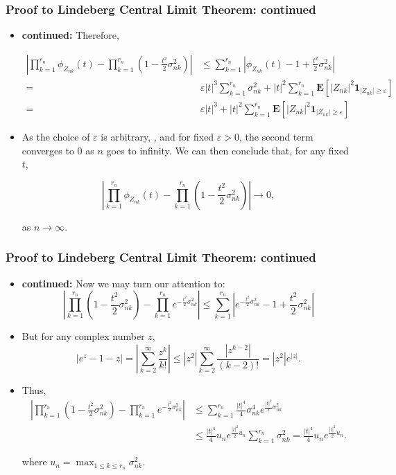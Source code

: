 \documentclass[handout]{beamer}
\newcommand{\BE}{\mathbf{E}}
\newcommand{\BI}{\mathbf{1}}
\begin{document}
 
      \frame
{
  \frametitle{Proof to Lindeberg Central Limit Theorem: continued}
   \begin{itemize}

\item<1->\textbf{continued:}  Therefore, 

\begin{align*} |\prod_{k=1}^{r_n} \phi_{Z_{nk}}(t)-\prod_{k=1}^{r_n} (1-\frac{t^2}{2} \sigma^2_{nk})| &  \leq \sum_{k=1}^{r_n} | \phi_{Z_{nk}}(t)-1+\frac{t^2}{2} \sigma^2_{nk} | \\
=&\varepsilon |t|^3 \sum_{k=1}^{r_n} \sigma_{nk}^2 + |t|^2 \sum_{k=1}^{r_n} \BE[|Z_{nk}|^2 \BI_{|Z_{nk}|\geq \varepsilon}]  \\
=&\varepsilon |t|^3  + |t|^2 \sum_{k=1}^{r_n} \BE[|Z_{nk}|^2 \BI_{|Z_{nk}|\geq \varepsilon}] 
\end{align*}

\item<2->[-] As the choice of $\varepsilon$ is arbitrary, , and for fixed $\varepsilon>0$, the second term converges to 0 as $n$ goes to infinity. We can then conclude that, for any fixed $t$, 

$$ |\prod_{k=1}^{r_n} \phi_{Z_{nk}}(t)-\prod_{k=1}^{r_n} (1-\frac{t^2}{2} \sigma^2_{nk})|  \rightarrow 0,$$

as $n\rightarrow \infty.$

\end{itemize}
}



 
      \frame
{
  \frametitle{Proof to Lindeberg Central Limit Theorem: continued}
   \begin{itemize}

\item<1->\textbf{continued:}  Now we may turn our attention to: 
$$ |\prod_{k=1}^{r_n} (1-\frac{t^2}{2} \sigma^2_{nk})-\prod_{k=1}^{r_n} e^{-\frac{t^2}{2}\sigma^2_{nk}}| \leq \sum_{k=1}^{r_n}| e^{-\frac{t^2}{2}\sigma^2_{nk}}-1+\frac{t^2}{2} \sigma^2_{nk}|$$

\item<2->[-] But for any complex number $z$,
$$|e^z-1-z|=|\sum_{k=2}^{\infty} \frac{z^k}{k!}| \leq |z^2| \sum_{k=2}^{\infty} \frac{|z^{k-2}|}{(k-2)!}=|z^2| e^{|z|}.$$

\item<3->[-] Thus, 
\begin{align*} |\prod_{k=1}^{r_n} (1-\frac{t^2}{2} \sigma^2_{nk})-\prod_{k=1}^{r_n} e^{-\frac{t^2}{2}\sigma^2_{nk}}| &  \leq \sum_{k=1}^{r_n} \frac{|t|^4}{4}\sigma^4_{nk} e^{\frac{|t|^2}{2}\sigma^2_{nk}} \\
& \leq \frac{|t|^4}{4} u_n  e^{\frac{|t|^2}{2} u_n} \sum_{k=1}^{r_n} \sigma^2_{nk}= \frac{|t|^4}{4} u_n  e^{\frac{|t|^2}{2} u_n}.
\end{align*}

 where $u_n=\max_{1\leq k\leq r_n} \sigma_{nk}^2$.
 
\end{itemize}
}
\end{document}
